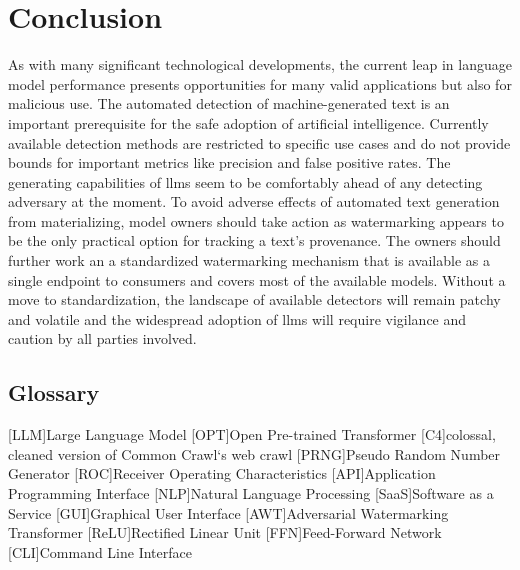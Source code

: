     \chapter{Conclusion}
    As with many significant technological developments, the current leap in language model performance presents opportunities for many valid applications but also for malicious use.  
    The automated detection of machine-generated text is an important prerequisite for the safe adoption of artificial intelligence.
    Currently available detection methods are restricted to specific use cases and do not provide bounds for important metrics like precision and false positive rates.
    The generating capabilities of \acp{llm} seem to be comfortably ahead of any detecting adversary at the moment.
    To avoid adverse effects of automated text generation from materializing, model owners should take action as watermarking appears to be the only practical option for tracking a text's provenance.
    The owners should further work an a standardized watermarking mechanism that is available as a single endpoint to consumers and covers most of the available models. 
    Without a move to standardization, the landscape of available detectors will remain patchy and volatile and the widespread adoption of \acp{llm} will require vigilance and caution by all parties involved.

    \newpage
    \printbibliography
    \newpage
    \section*{Glossary}
    \begin{acronym}
        [LLM]{Large Language Model}
        [OPT]{Open Pre-trained Transformer}
        [C4]{colossal, cleaned version of Common Crawl`s web crawl}
		{Pseudo Random Number Generator}
        [ROC]{Receiver Operating Characteristics}
        [API]{Application Programming Interface}
        [NLP]{Natural Language Processing}
        [SaaS]{Software as a Service}
        [GUI]{Graphical User Interface}
        [AWT]{Adversarial Watermarking Transformer}
        [ReLU]{Rectified Linear Unit}
        [FFN]{Feed-Forward Network}
        [CLI]{Command Line Interface}
    \end{acronym}

